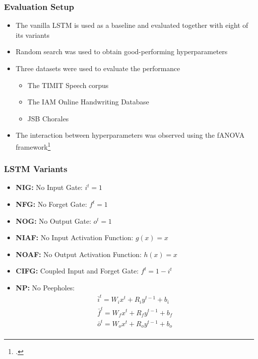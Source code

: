 \documentclass{beamer}
\begin{document}
\begin{frame}
\frametitle{Evaluation Setup}
\begin{itemize}
	\item The vanilla LSTM is used as a baseline and evaluated together with eight of its variants
	\item Random search was used to obtain good-performing hyperparameters
	\item Three datasets were used to evaluate the performance
	\begin{itemize}
		\item The TIMIT Speech corpus
		\item The IAM Online Handwriting Database
		\item JSB Chorales
	\end{itemize}
	\item The interaction between hyperparameters was observed using the fANOVA framework\footcite{HutHooLey14}
\end{itemize}
\end{frame}

\begin{frame}
\frametitle{LSTM Variants}
\begin{itemize}
	\item \textbf{NIG:} No Input Gate: \(i^t = 1\)
	\item \textbf{NFG:} No Forget Gate: \(f^t = 1\)
	\item \textbf{NOG:} No Output Gate: \(o^t = 1\)
	\item \textbf{NIAF:} No Input Activation Function: \(g(x) = x\)
	\item \textbf{NOAF:} No Output Activation Function: \(h(x) = x\)
	\item \textbf{CIFG:} Coupled Input and Forget Gate: \(f^t = 1 - i^t\)
	\item \textbf{NP:} No Peepholes:
	\begin{align*}
		&\bar{i}^t = W_i x^t + R_i y^{t-1} + b_i& \\
		&\bar{f}^t = W_f x^t + R_f y^{t-1} + b_f& \\
		&\bar{o}^t = W_o x^t + R_o y^{t-1} + b_o& \\
	\end{align*}
\end{itemize}
\end{frame}
\end{document}
